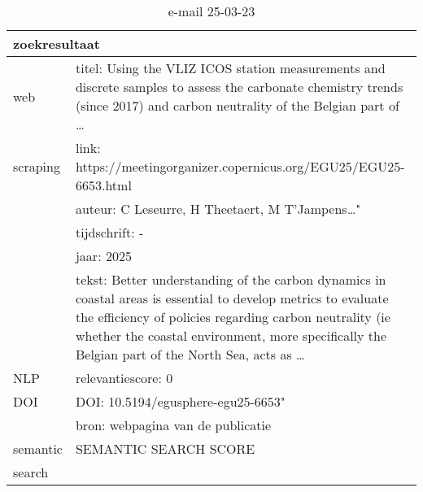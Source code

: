 \begin{table}[h!]
    \caption{e-mail 25-03-23}
    \centering
    \begin{tabularx}{\textwidth}{|p{4cm}|X|} 
        \hline
        \multicolumn{2}{|X|}{\textbf{zoekresultaat}} \\
        \hline
        web &titel: Using the VLIZ ICOS station measurements and discrete samples to assess the carbonate chemistry trends (since 2017) and carbon neutrality of the Belgian part of …\\
        scraping&link: https://meetingorganizer.copernicus.org/EGU25/EGU25-6653.html\\
        &auteur: C Leseurre, H Theetaert, M T'Jampens…"\\
        &tijdschrift: -\\
        &jaar: 2025\\
        &tekst: Better understanding of the carbon dynamics in coastal areas is essential to develop metrics to evaluate the efficiency of policies regarding carbon neutrality (ie whether the coastal environment, more specifically the Belgian part of the North Sea, acts as …\\
        \hline
        NLP&relevantiescore: 0\\
        \hline
        DOI&DOI: 10.5194/egusphere-egu25-6653"\\
        &bron: webpagina van de publicatie\\
        \hline
        semantic&SEMANTIC SEARCH SCORE\\
        search&\\
        \hline
    \end{tabularx}
    \label{table:email20250323}
\end{table}
